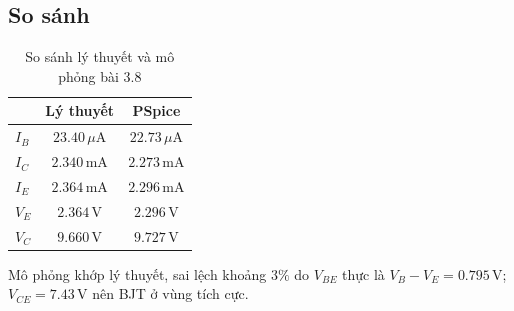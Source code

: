 \subsection{So sánh}
\begin{table}[H]
\centering
\begin{tabular}{l|c|c}
\toprule
 & Lý thuyết & PSpice \\
\midrule
$I_B$ & $23.40\,\mu\text{A}$ & $22.73\,\mu\text{A}$ \\
$I_C$ & $2.340\,\text{mA}$ & $2.273\,\text{mA}$ \\
$I_E$ & $2.364\,\text{mA}$ & $2.296\,\text{mA}$ \\
$V_E$ & $2.364\,\text{V}$ & $2.296\,\text{V}$ \\
$V_C$ & $9.660\,\text{V}$ & $9.727\,\text{V}$ \\
\bottomrule
\end{tabular}
\caption{So sánh lý thuyết và mô phỏng bài 3.8}
\end{table}

Mô phỏng khớp lý thuyết, sai lệch khoảng $3\%$ do $V_{BE}$ thực là $V_B - V_E = 0.795\,\text{V}$; $V_{CE} = 7.43\,\text{V}$ nên BJT ở vùng tích cực.
